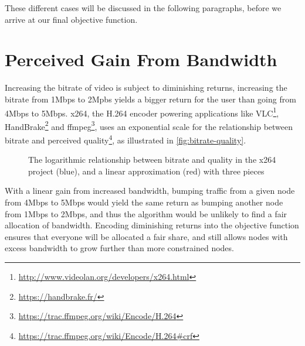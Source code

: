 These different cases will be discussed in the following paragraphs, before we arrive at our final objective function.


\section{Perceived Gain From Bandwidth}

Increasing the bitrate of video is subject to diminishing returns, increasing the bitrate from 1Mbps to 2Mpbs yields a bigger return for the user than going from 4Mbps to 5Mbps. x264, the H.264 encoder powering applications like VLC\footnote{\url{http://www.videolan.org/developers/x264.html}}, HandBrake\footnote{\url{https://handbrake.fr/}} and ffmpeg\footnote{\url{https://trac.ffmpeg.org/wiki/Encode/H.264}}, uses an exponential scale for the relationship between bitrate and perceived quality\footnote{\url{https://trac.ffmpeg.org/wiki/Encode/H.264\#crf}}, as illustrated in \autoref{fig:bitrate-quality}.

\begin{figure}
    \centering


    \caption{The logarithmic relationship between bitrate and quality in the x264 project (blue), and a linear approximation (red) with three pieces}
    \label{fig:bitrate-quality}
\end{figure}

With a linear gain from increased bandwidth, bumping traffic from a given node from 4Mbps to 5Mbps would yield the same return as bumping another node from 1Mbps to 2Mbps, and thus the algorithm would be unlikely to find a fair allocation of bandwidth. Encoding diminishing returns into the objective function ensures that everyone will be allocated a fair share, and still allows nodes with excess bandwidth to grow further than more constrained nodes.

